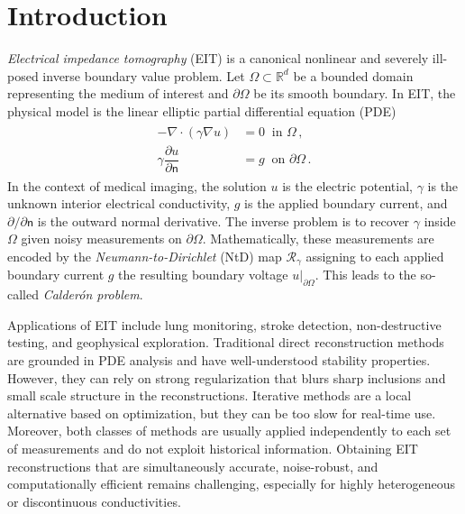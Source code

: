 \documentclass[pdflatex,sn-mathphys-num]{sn-jnl-preprint}
\newcommand{\R}{\mathbb{R}}
\newcommand{\pOmega}{{\partial\Omega}}
\newcommand{\ntd}{\mathscr{R}_{\gamma}}
\theoremstyle{thmstyleone}%
\theoremstyle{thmstyletwo}%
\theoremstyle{thmstylethree}%
\numberwithin{equation}{section}
\numberwithin{theorem}{section}
\begin{document}


\maketitle

\setcounter{tocdepth}{3}
\tableofcontents

\clearpage

\section{Introduction}\label{sec:intro}
\emph{Electrical impedance tomography} (EIT) is a canonical nonlinear and severely ill-posed inverse boundary value problem. Let $ \Omega\subset \R^d $ be a bounded domain representing the medium of interest and $ \pOmega $ be its smooth boundary. In EIT, the physical model is the linear elliptic partial differential equation (PDE)
\begin{align}\label{eqn:elliptic}
\begin{split}
    -\nabla\cdot(\gamma \nabla u)&=0 \ \text{ in } \Omega\,, \\ 
    \gamma\dfrac{\partial u}{\partial \mathsf{n}}&=g \ \text{ on } \pOmega\,.
\end{split}
\end{align}
In the context of medical imaging, the solution $u$ is the electric potential, $\gamma$ is the unknown interior electrical conductivity, $g$ is the applied boundary current, and $\partial/\partial\mathsf{n}$ is the outward normal derivative. The inverse problem is to recover $ \gamma $ inside $\Omega$ given noisy measurements on $\pOmega$. Mathematically, these measurements are encoded by the \emph{Neumann-to-Dirichlet} (NtD) map $\ntd$ assigning to each applied boundary current $g$ the resulting boundary voltage $u|_{\pOmega}$. This leads to the so-called \emph{Calder\'on problem}.

Applications of EIT include lung monitoring, stroke detection, non-destructive testing, and geophysical exploration. Traditional direct reconstruction methods are grounded in PDE analysis and have well-understood stability properties. However, they can rely on strong regularization that blurs sharp inclusions and small scale structure in the reconstructions. Iterative methods are a local alternative based on optimization, but they can be too slow for real-time use. Moreover, both classes of methods are usually applied independently to each set of measurements and do not exploit historical information. Obtaining EIT reconstructions that are simultaneously accurate, noise-robust, and computationally efficient remains challenging, especially for highly heterogeneous or discontinuous conductivities.
\end{document}
